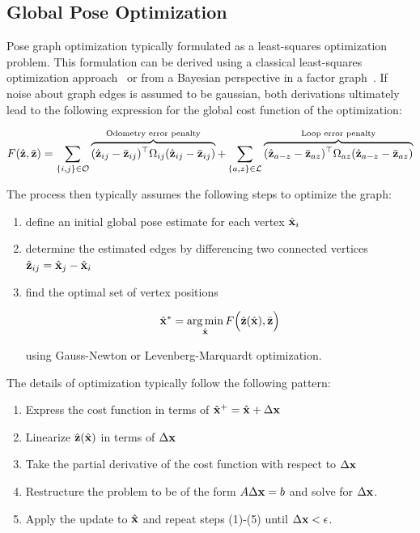\subsection{Global Pose Optimization}


Pose graph optimization typically formulated as a least-squares optimization problem.  This formulation can be derived using a classical least-squares optimization approach~\cite{Kummerle2011} or from a Bayesian perspective in a factor graph~\cite{Kaess2008}.  If noise about graph edges is assumed to be gaussian, both derivations ultimately lead to the following expression for the global cost function of the optimization:

\begin{align}
  F(\hat{\mathbf{z}},\bar{\mathbf{z}}) = \sum_{\{i,j\} \in \mathcal{O}} \overbrace{(\hat{\mathbf{z}}_{ij}-\bar{\mathbf{z}}_{ij})^\top\Omega_{ij}(\hat{\mathbf{z}}_{ij}-\bar{\mathbf{z}}_{ij})}^\text{Odometry error penalty} + \sum_{\{a,z\} \in \mathcal{L}} \overbrace{ (\hat{\mathbf{z}}_{a-z}-\bar{\mathbf{z}}_{az})^\top \Omega_{az} (\hat{\mathbf{z}}_{a-z}-\bar{\mathbf{z}}_{az}) }^\text{Loop error penalty}
  \label{eqn:cost_function}
\end{align}

The process then typically assumes the following steps to optimize the graph:

\begin{enumerate}
  \item define an initial global pose estimate for each vertex $\hat{\mathbf{x}}_i$
  \item determine the estimated edges by differencing two connected vertices $\hat{\mathbf{z}}_{ij} = \hat{\mathbf{x}}_j - \hat{\mathbf{x}}_i$
  \item find the optimal set of vertex positions

  \begin{align}
      \hat{\mathbf{x}}^* = \operatorname*{arg\,min}_{\hat{\mathbf{x}}} F\Big(\hat{\mathbf{z}}(\hat{\mathbf{x}}),\bar{\mathbf{z}} \Big)
	     \label{eqn:global_opt}
	\end{align}


   using Gauss-Newton or Levenberg-Marquardt optimization.
\end{enumerate}

The details of optimization typically follow the following pattern:
\begin{enumerate}
	\item Express the cost function in terms of $\hat{\mathbf{x}}^+ = \hat{\mathbf{x}} + \Delta\mathbf{x}$
	\item Linearize $\hat{\mathbf{z}}(\hat{\mathbf{x}})$ in terms of $\Delta\mathbf{x}$
	\item Take the partial derivative of the cost function with respect to $\Delta\mathbf{x}$
	\item Restructure the problem to be of the form $A \Delta \mathbf{x} = b$ and solve for $\Delta\mathbf{x}$.
	\item Apply the update to $\hat{\mathbf{x}}$ and repeat steps (1)-(5) until $\Delta\mathbf{x} < \epsilon$.
 \end{enumerate}

